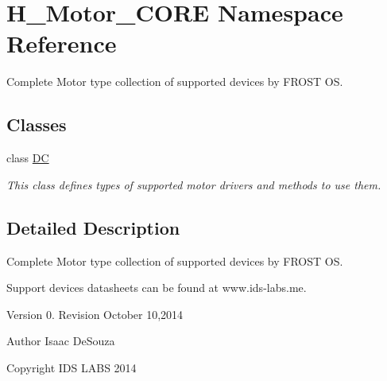 \hypertarget{namespaceH__Motor__CORE}{}\section{H\+\_\+\+Motor\+\_\+\+C\+O\+R\+E Namespace Reference}
\label{namespaceH__Motor__CORE}


Complete Motor type collection of supported devices by F\+R\+O\+S\+T O\+S.  


\subsection*{Classes}
\begin{DoxyCompactItemize}
\item 
class \hyperlink{classH__Motor__CORE_1_1DC}{D\+C}
\begin{DoxyCompactList}\small\item\em This class defines types of supported motor drivers and methods to use them. \end{DoxyCompactList}\end{DoxyCompactItemize}


\subsection{Detailed Description}
Complete Motor type collection of supported devices by F\+R\+O\+S\+T O\+S. 

Support devices datasheets can be found at www.\+ids-\/labs.\+me.

Version 0. Revision October 10,2014

\begin{DoxyAuthor}{Author}
Isaac De\+Souza 
\end{DoxyAuthor}
\begin{DoxyCopyright}{Copyright}
I\+D\+S L\+A\+B\+S 2014 
\end{DoxyCopyright}
